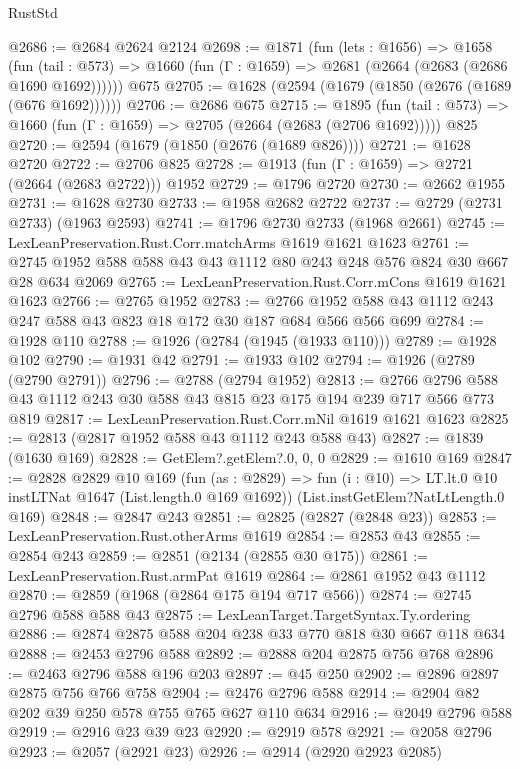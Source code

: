 \begin{lexlean}{RustStd}
\begin{coremodule}
@2686 := @2684 @2624 @2124
@2698 := @1871
    (fun (lets : @1656) =>
    @1658
      (fun (tail : @573) => @1660 (fun (Γ : @1659) => @2681 (@2664 (@2683 (@2686 @1690 @1692))))))
    @675
@2705 := @1628 (@2594 (@1679 (@1850 (@2676 (@1689 (@676 @1692))))))
@2706 := @2686 @675
@2715 := @1895
    (fun (tail : @573) => @1660 (fun (Γ : @1659) => @2705 (@2664 (@2683 (@2706 @1692)))))
    @825
@2720 := @2594 (@1679 (@1850 (@2676 (@1689 @826))))
@2721 := @1628 @2720
@2722 := @2706 @825
@2728 := @1913 (fun (Γ : @1659) => @2721 (@2664 (@2683 @2722))) @1952
@2729 := @1796 @2720
@2730 := @2662 @1955
@2731 := @1628 @2730
@2733 := @1958 @2682 @2722
@2737 := @2729 (@2731 @2733) (@1963 @2593)
@2741 := @1796 @2730 @2733 (@1968 @2661)
@2745 := LexLeanPreservation.Rust.Corr.matchArms @1619 @1621 @1623
@2761 := @2745 @1952 @588 @588 @43 @43 @1112 @80 @243 @248 @576 @824 @30 @667 @28 @634 @2069
@2765 := LexLeanPreservation.Rust.Corr.mCons @1619 @1621 @1623
@2766 := @2765 @1952
@2783 := @2766 @1952 @588 @43 @1112 @243 @247 @588 @43 @823 @18 @172 @30 @187 @684 @566 @566 @699
@2784 := @1928 @110
@2788 := @1926 (@2784 (@1945 (@1933 @110)))
@2789 := @1928 @102
@2790 := @1931 @42
@2791 := @1933 @102
@2794 := @1926 (@2789 (@2790 @2791))
@2796 := @2788 (@2794 @1952)
@2813 := @2766 @2796 @588 @43 @1112 @243 @30 @588 @43 @815 @23 @175 @194 @239 @717 @566 @773 @819
@2817 := LexLeanPreservation.Rust.Corr.mNil @1619 @1621 @1623
@2825 := @2813 (@2817 @1952 @588 @43 @1112 @243 @588 @43)
@2827 := @1839 (@1630 @169)
@2828 := GetElem?.getElem?.{0, 0, 0}
@2829 := @1610 @169
@2847 := @2828
    @2829
    @10
    @169
    (fun (as : @2829) =>
    fun (i : @10) => LT.lt.{0} @10 instLTNat @1647 (List.length.{0} @169 @1692))
    (List.instGetElem?NatLtLength.{0} @169)
@2848 := @2847 @243
@2851 := @2825 (@2827 (@2848 @23))
@2853 := LexLeanPreservation.Rust.otherArms @1619
@2854 := @2853 @43
@2855 := @2854 @243
@2859 := @2851 (@2134 (@2855 @30 @175))
@2861 := LexLeanPreservation.Rust.armPat @1619
@2864 := @2861 @1952 @43 @1112
@2870 := @2859 (@1968 (@2864 @175 @194 @717 @566))
@2874 := @2745 @2796 @588 @588 @43
@2875 := LexLeanTarget.TargetSyntax.Ty.ordering
@2886 := @2874 @2875 @588 @204 @238 @33 @770 @818 @30 @667 @118 @634
@2888 := @2453 @2796 @588
@2892 := @2888 @204 @2875 @756 @768
@2896 := @2463 @2796 @588 @196 @203
@2897 := @45 @250
@2902 := @2896 @2897 @2875 @756 @766 @758
@2904 := @2476 @2796 @588
@2914 := @2904 @82 @202 @39 @250 @578 @755 @765 @627 @110 @634
@2916 := @2049 @2796 @588
@2919 := @2916 @23 @39 @23
@2920 := @2919 @578
@2921 := @2058 @2796
@2923 := @2057 (@2921 @23)
@2926 := @2914 (@2920 @2923 @2085)

\end{coremodule}
\end{lexlean}
